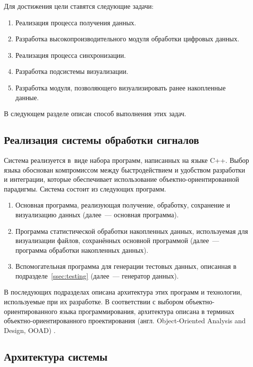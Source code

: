 \documentclass[a4paper, 14pt, titlepage]{extarticle}
\newcommand{\eng}[1]{\foreignlanguage{english}{#1}}
\begin{document}
  Для достижения цели ставятся следующие задачи:
  \begin{enumerate}
    \item Реализация процесса получения данных.
    \item Разработка высокопроизводительного модуля обработки цифровых данных.
    \item Реализация процесса синхронизации.
    \item Разработка подсистемы визуализации.
    \item Разработка модуля, позволяющего визуализировать ранее накопленные данные.
  \end{enumerate}

  В следующем разделе описан способ выполнения этих задач.

  \subsection{Реализация системы обработки сигналов}\label{ssec:impl}

  Система реализуется в~виде набора программ, написанных на языке C++. Выбор языка обоснован
  компромиссом между быстродействием и удобством разработки и интеграции, которые обеспечивает
  использование объектно-ориентированной парадигмы. Система состоит из следующих программ.

  \begin{enumerate}
    \item Основная программа, реализующая получение, обработку, сохранение и визуализацию данных
      (далее~--- основная программа).
    \item Программа статистической обработки накопленных данных, используемая для визуализации
      файлов, сохранённых основной программой (далее~--- программа обработки накопленных данных).
    \item Вспомогательная программа для генерации тестовых данных, описанная в подразделе~\ref{ssec:testing}
      (далее~--- генератор данных).
  \end{enumerate}

  В последующих подразделах описана архитектура этих программ и технологии, используемые при их
  разработке. В соответствии с выбором объектно-ориентированного языка программирования, архитектура описана в
  терминах объектно-ориентированного проектирования (англ. \eng{Object-Oriented Analysis and Design,
  OOAD}) \cite{booch-ooad}.

  \subsection{Архитектура системы}
\end{document}
